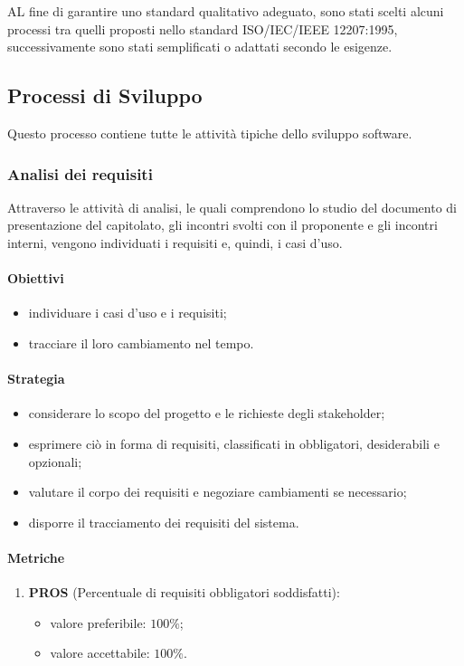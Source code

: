 AL fine di garantire uno standard qualitativo adeguato, sono stati scelti alcuni processi tra quelli proposti nello standard ISO/IEC/IEEE 12207:1995,
successivamente sono stati semplificati o adattati secondo le esigenze.

\subsection{Processi di Sviluppo}
    Questo processo contiene tutte le attività tipiche dello sviluppo software.
    \subsubsection{Analisi dei requisiti}
        Attraverso le attivit\`{a} di analisi, le quali comprendono lo studio del documento di presentazione del capitolato, gli incontri svolti con il proponente e gli incontri interni, vengono individuati i requisiti e, quindi, i casi d'uso.   

        \paragraph{Obiettivi}
            \begin{itemize}
                \item individuare i casi d'uso e i requisiti;
                \item tracciare il loro cambiamento nel tempo.
            \end{itemize}
        \paragraph{Strategia}
            \begin{itemize}
                \item considerare lo scopo del progetto e le richieste degli stakeholder;
                \item esprimere ciò in forma di requisiti, classificati in obbligatori, desiderabili e opzionali;
                \item valutare il corpo dei requisiti e negoziare cambiamenti se necessario;
                \item disporre il tracciamento dei requisiti del sistema.
            \end{itemize}
        \paragraph{Metriche}
            \begin{enumerate}
                \item \textbf{PROS} (Percentuale di requisiti obbligatori soddisfatti):
                \begin{itemize}
                    \item valore preferibile: $100\%$;
                    \item valore accettabile: $100\%$.
                \end{itemize}
            \end{enumerate}
